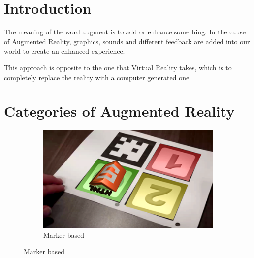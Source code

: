 \documentclass[12 pct]{report}
\begin{document}
\section{Introduction}
The meaning of the word augment is to add or enhance something. In the cause of Augmented Reality, graphics, sounds and different feedback are added into our world to create an enhanced experience.

This approach is opposite to the one that Virtual Reality takes, which is to completely replace the reality with a computer generated one.

\section{Categories of Augmented Reality}
\begin{figure}[h!]
  \centering
  \begin{subfigure}[b]{0.36\linewidth}
    \includegraphics[width=\linewidth]{marker-based}
     \caption{Marker based}
     

\end{subfigure}
\end{figure}
\end{document}
